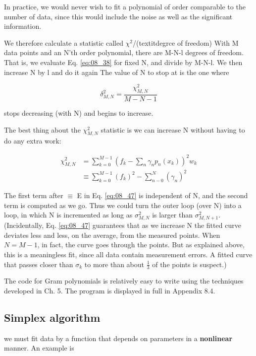 In practice, we would never wish to fit a polynomial of order comparable to the number of data, since this would include the noise as well as the significant information.

We therefore calculate a statistic called $\chi^{2}$/(textit{degrce of freedom}) With M data points and an N'th order polynomial, there are M-N-l degrees of freedom. That is, we evaluate Eq. \ref{eq:08_38} for fixed N, and divide by M-N-l. We then increase N by l and do it again The value of N to stop at is the one where

\begin{equation*}
\delta_{M,N}^{2} = \frac{\chi_{M,N}^{2}}{M-N-1}
\end{equation*}

stops decreasing (with N) and begins to increase.

The best thing about the $\chi_{M,N}^{2}$ statistic is we can increase N without having to do any extra work:

\begin{equation}\label{eq:08_47}
    \begin{split}
        \chi_{M,N}^{2} &= \sum_{k=0}^{M-1} (f_{k} - \sum_{n} \gamma_{n}p_{n}(x_{k}))^2 w_{k} \\
        &\equiv \sum_{k=0}^{M-1} (f_{k})^{2} - \sum_{n-0}^{N} (\gamma_{n})^2
    \end{split}
\end{equation}

The first term after $\equiv$ E in Eq. \ref{eq:08_47} is independent of N, and the second term is computed as we go. Thus we could turn the outer loop (over N) into a  loop, in which N is incremented as long as $\sigma_{M,N}^{2}$ is larger than $\sigma_{M,N+1}^{2}$. (Incidentally, Eq. \ref{eq:08_47} guarantees that as we increase N the fitted curve deviates less and less, on the average, from the measured points. When $N = M-1$, in fact, the curve goes through the points. But as explained above, this is a meaningless fit, since all data contain measurement errors. A fitted curve that passes closer than $\sigma_{k}$ to more than about $\frac{1}{3}$ of the points is suspect.)

The code for Gram polynomials is relatively easy to write using the techniques developed in Ch. 5. The program is displayed in full in Appendix 8.4.

\subsection{Simplex algorithm}\label{chap:08_02_03}
 we must fit data by a function that depends on parameters in a \textbf{nonlinear} manner. An example is

